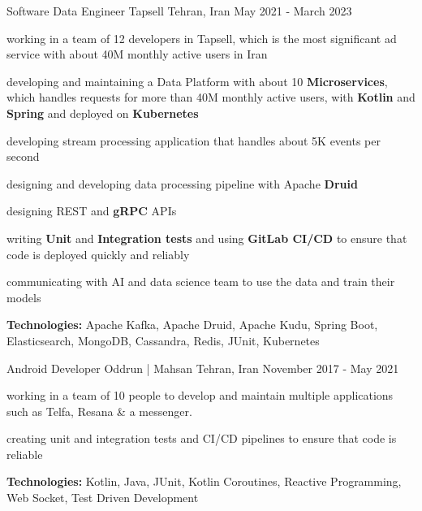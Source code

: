 \begin{cventries}
    \cventry
    {Software Data Engineer} %
    {Tapsell} %
    {Tehran, Iran} %
    {May 2021 - March 2023} %
    {
      \begin{cvitems} %
        \item working in a team of 12 developers in Tapsell, which is the most significant ad service with about 40M monthly active users in Iran
        \item developing and maintaining a Data Platform with about 10 \textbf{Microservices}, which handles requests for more than 40M monthly active users, with \textbf{Kotlin} and 
        \textbf{Spring} and deployed on \textbf{Kubernetes} 
        \item developing stream processing application that handles about 5K events per second
        \item designing and developing data processing pipeline with Apache \textbf{Druid}
        \item designing REST and \textbf{gRPC} APIs
        \item writing \textbf{Unit} and \textbf{Integration tests} and using \textbf{GitLab CI/CD} to ensure that code is deployed quickly and reliably
        \item communicating with AI and data science team to use the data and train their models
        \item \textbf{Technologies:} Apache Kafka, Apache Druid, Apache Kudu, Spring Boot, Elasticsearch, MongoDB, Cassandra, Redis, JUnit, Kubernetes
      \end{cvitems}
    }

    \cventry
    {Android Developer} %
    {Oddrun | Mahsan} %
    {Tehran, Iran} %
    {November 2017 - May 2021} %
    {
      \begin{cvitems} %
        \item working in a team of 10 people to develop and maintain multiple applications such as Telfa, Resana \& a messenger.
        \item creating unit and integration tests and CI/CD pipelines to ensure that code is reliable
        \item \textbf{Technologies:} Kotlin, Java, JUnit, Kotlin Coroutines, Reactive Programming, Web Socket, Test Driven Development
      \end{cvitems}
    }

\end{cventries}
